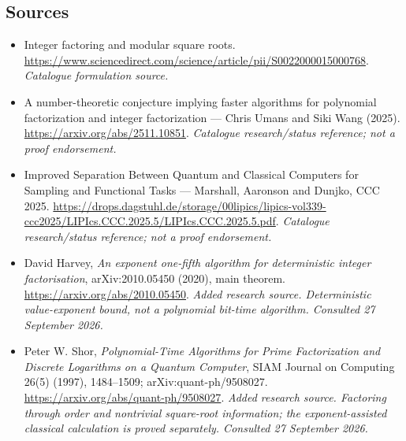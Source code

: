 \documentclass[11pt,a4paper]{article}
\begin{document}
\subsection{Sources}
\begin{itemize}\raggedright
\item[\textnormal{[S1]}]\hypertarget{source:8400004:1}{} Integer factoring and modular square roots.
\url{https://www.sciencedirect.com/science/article/pii/S0022000015000768}.
{\small\textit{Catalogue formulation source.}}
\item[\textnormal{[S2]}]\hypertarget{source:8400004:2}{} A number-theoretic conjecture implying faster algorithms for polynomial factorization and integer factorization — Chris Umans and Siki Wang (2025).
\url{https://arxiv.org/abs/2511.10851}.
{\small\textit{Catalogue research/status reference; not a proof endorsement.}}
\item[\textnormal{[S3]}]\hypertarget{source:8400004:3}{} Improved Separation Between Quantum and Classical Computers for Sampling and Functional Tasks — Marshall, Aaronson and Dunjko, CCC 2025.
\url{https://drops.dagstuhl.de/storage/00lipics/lipics-vol339-ccc2025/LIPIcs.CCC.2025.5/LIPIcs.CCC.2025.5.pdf}.
{\small\textit{Catalogue research/status reference; not a proof endorsement.}}
\item[\textnormal{[E1]}]\hypertarget{extra:8400004:1}{} David Harvey, \emph{An exponent one-fifth algorithm for deterministic integer factorisation}, arXiv:2010.05450 (2020), main theorem.
\url{https://arxiv.org/abs/2010.05450}.
{\small\textit{Added research source. Deterministic value-exponent bound, not a polynomial bit-time algorithm. Consulted 27 September 2026.}}
\item[\textnormal{[E2]}]\hypertarget{extra:8400004:2}{} Peter W. Shor, \emph{Polynomial-Time Algorithms for Prime Factorization and Discrete Logarithms on a Quantum Computer}, SIAM Journal on Computing 26(5) (1997), 1484--1509; arXiv:quant-ph/9508027.
\url{https://arxiv.org/abs/quant-ph/9508027}.
{\small\textit{Added research source. Factoring through order and nontrivial square-root information; the exponent-assisted classical calculation is proved separately. Consulted 27 September 2026.}}
\end{itemize}

\end{document}
